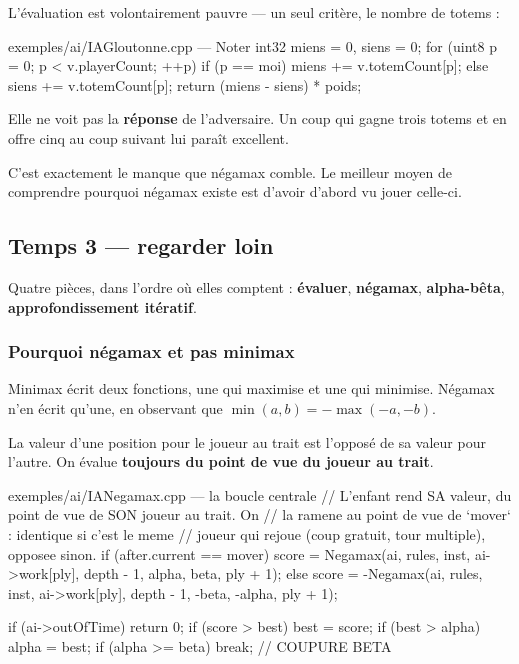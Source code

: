 L'évaluation est volontairement pauvre — un seul critère, le nombre de totems :

\begin{nkcode}{exemples/ai/IAGloutonne.cpp — Noter}
int32 miens = 0, siens = 0;
for (uint8 p = 0; p < v.playerCount; ++p) {
    if (p == moi) miens += v.totemCount[p];
    else          siens += v.totemCount[p];
}
return (miens - siens) * poids;
\end{nkcode}

\begin{nkretenir}
Elle ne voit pas la \textbf{réponse} de l'adversaire. Un coup qui gagne trois
totems et en offre cinq au coup suivant lui paraît excellent.

C'est exactement le manque que négamax comble. Le meilleur moyen de comprendre
pourquoi négamax existe est d'avoir d'abord vu jouer celle-ci.
\end{nkretenir}

\subsection{Temps 3 — regarder loin}

Quatre pièces, dans l'ordre où elles comptent : \textbf{évaluer},
\textbf{négamax}, \textbf{alpha-bêta}, \textbf{approfondissement itératif}.

\subsubsection{Pourquoi négamax et pas minimax}

Minimax écrit deux fonctions, une qui maximise et une qui minimise. Négamax n'en
écrit qu'une, en observant que $\min(a, b) = -\max(-a, -b)$.

La valeur d'une position pour le joueur au trait est l'opposé de sa valeur pour
l'autre. On évalue \textbf{toujours du point de vue du joueur au trait}.

\begin{nkcode}{exemples/ai/IANegamax.cpp — la boucle centrale}
// L'enfant rend SA valeur, du point de vue de SON joueur au trait. On
// la ramene au point de vue de `mover` : identique si c'est le meme
// joueur qui rejoue (coup gratuit, tour multiple), opposee sinon.
if (after.current == mover) {
    score = Negamax(ai, rules, inst, ai->work[ply], depth - 1,
                    alpha, beta, ply + 1);
} else {
    score = -Negamax(ai, rules, inst, ai->work[ply], depth - 1,
                     -beta, -alpha, ply + 1);
}

if (ai->outOfTime) return 0;
if (score > best) best = score;
if (best > alpha) alpha = best;
if (alpha >= beta) break;    // COUPURE BETA
\end{nkcode}

